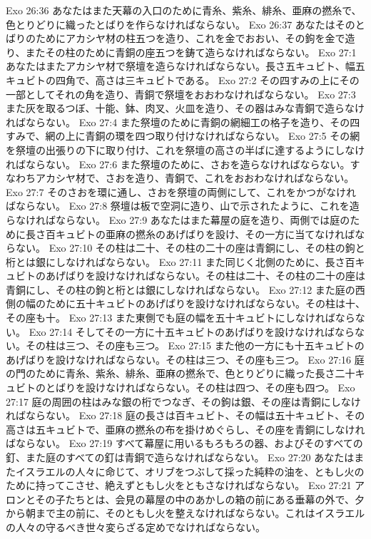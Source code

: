 Exo 26:36  あなたはまた天幕の入口のために青糸、紫糸、緋糸、亜麻の撚糸で、色とりどりに織ったとばりを作らなければならない。
Exo 26:37  あなたはそのとばりのためにアカシヤ材の柱五つを造り、これを金でおおい、その鉤を金で造り、またその柱のために青銅の座五つを鋳て造らなければならない。
Exo 27:1  あなたはまたアカシヤ材で祭壇を造らなければならない。長さ五キュビト、幅五キュビトの四角で、高さは三キュビトである。
Exo 27:2  その四すみの上にその一部としてそれの角を造り、青銅で祭壇をおおわなければならない。
Exo 27:3  また灰を取るつぼ、十能、鉢、肉叉、火皿を造り、その器はみな青銅で造らなければならない。
Exo 27:4  また祭壇のために青銅の網細工の格子を造り、その四すみで、網の上に青銅の環を四つ取り付けなければならない。
Exo 27:5  その網を祭壇の出張りの下に取り付け、これを祭壇の高さの半ばに達するようにしなければならない。
Exo 27:6  また祭壇のために、さおを造らなければならない。すなわちアカシヤ材で、さおを造り、青銅で、これをおおわなければならない。
Exo 27:7  そのさおを環に通し、さおを祭壇の両側にして、これをかつがなければならない。
Exo 27:8  祭壇は板で空洞に造り、山で示されたように、これを造らなければならない。
Exo 27:9  あなたはまた幕屋の庭を造り、両側では庭のために長さ百キュビトの亜麻の撚糸のあげばりを設け、その一方に当てなければならない。
Exo 27:10  その柱は二十、その柱の二十の座は青銅にし、その柱の鉤と桁とは銀にしなければならない。
Exo 27:11  また同じく北側のために、長さ百キュビトのあげばりを設けなければならない。その柱は二十、その柱の二十の座は青銅にし、その柱の鉤と桁とは銀にしなければならない。
Exo 27:12  また庭の西側の幅のために五十キュビトのあげばりを設けなければならない。その柱は十、その座も十。
Exo 27:13  また東側でも庭の幅を五十キュビトにしなければならない。
Exo 27:14  そしてその一方に十五キュビトのあげばりを設けなければならない。その柱は三つ、その座も三つ。
Exo 27:15  また他の一方にも十五キュビトのあげばりを設けなければならない。その柱は三つ、その座も三つ。
Exo 27:16  庭の門のために青糸、紫糸、緋糸、亜麻の撚糸で、色とりどりに織った長さ二十キュビトのとばりを設けなければならない。その柱は四つ、その座も四つ。
Exo 27:17  庭の周囲の柱はみな銀の桁でつなぎ、その鉤は銀、その座は青銅にしなければならない。
Exo 27:18  庭の長さは百キュビト、その幅は五十キュビト、その高さは五キュビトで、亜麻の撚糸の布を掛けめぐらし、その座を青銅にしなければならない。
Exo 27:19  すべて幕屋に用いるもろもろの器、およびそのすべての釘、また庭のすべての釘は青銅で造らなければならない。
Exo 27:20  あなたはまたイスラエルの人々に命じて、オリブをつぶして採った純粋の油を、ともし火のために持ってこさせ、絶えずともし火をともさなければならない。
Exo 27:21  アロンとその子たちとは、会見の幕屋の中のあかしの箱の前にある垂幕の外で、夕から朝まで主の前に、そのともし火を整えなければならない。これはイスラエルの人々の守るべき世々変らざる定めでなければならない。
